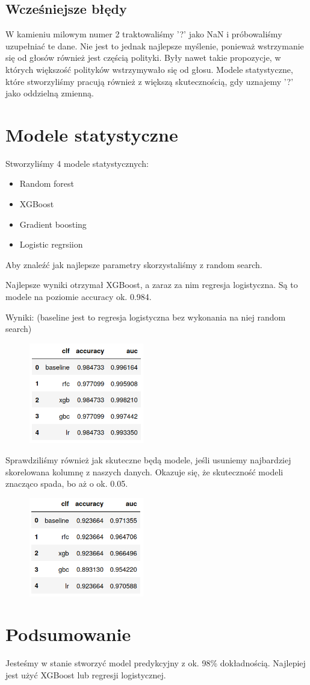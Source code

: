 \documentclass{article}
\begin{document}
\subsection{Wcześniejsze błędy}

W kamieniu milowym numer 2 traktowaliśmy '?' jako NaN i próbowaliśmy uzupełniać te dane. Nie jest to jednak najlepsze myślenie, ponieważ wstrzymanie się od głosów również jest częścią polityki. Były nawet takie propozycje, w których większość polityków wstrzymywało się od głosu. Modele statystyczne, które stworzyliśmy pracują również z większą skutecznością, gdy uznajemy '?' jako oddzielną zmienną. 

\section{Modele statystyczne}

Stworzyliśmy 4 modele statystycznych: 

\begin{itemize}
    \item Random forest
    \item XGBoost
    \item Gradient boosting
    \item Logistic regrsiion
\end{itemize}

Aby znaleźć jak najlepsze parametry skorzystaliśmy z random search. 

Najlepsze wyniki otrzymał XGBoost, a zaraz za nim regresja logistyczna. Są to modele na poziomie accuracy ok. 0.984.

Wyniki: (baseline jest to regresja logistyczna bez wykonania na niej random search)

\begin{figure}[!hb]
\centering
\includegraphics[width=5cm]{zdjecia/tabela.png}
\end{figure}

Sprawdziliśmy również jak skuteczne będą modele, jeśli usuniemy najbardziej skorelowana kolumnę z naszych danych. Okazuje się, że skuteczność modeli znacząco spada, bo aż o ok. 0.05.

\begin{figure}[!ht]
\centering
\includegraphics[width=5cm]{zdjecia/tabela_droped.png}
\end{figure}

\section{Podsumowanie}

Jesteśmy w stanie stworzyć model predykcyjny z ok. 98\% dokładnością. Najlepiej jest użyć XGBoost lub regresji logistycznej. 
\end{document}
